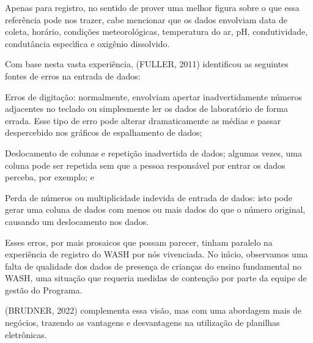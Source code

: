 \documentclass[
12pt,		%
openright,	%
twoside,  %
a4paper,			%
chapter=TITLE,		%
english,			%
french,				%
spanish,			%
brazil				%
]{USPSC-classe/USPSC}
\begin{document}
Apenas para registro, no sentido de prover uma melhor figura sobre o que essa refer\^encia pode nos trazer, cabe mencionar que os dados envolviam data de coleta, hor\'ario, condi\c{c}\~oes meteorol\'ogicas, temperatura do ar, pH, condutividade, condut\^ancia espec\'{\i}fica e oxig\^enio dissolvido.









Com base nesta vasta experi\^encia,  (FULLER, 2011) identificou as seguintes fontes de erros na entrada de dados:










\begin{alineas}
\item Erros de digita\c{c}\~ao: normalmente, envolviam apertar inadvertidamente n\'umeros adjacentes no teclado ou simplesmente ler os dados de laborat\'orio de forma errada. Esse tipo de erro pode alterar dramaticamente as m\'edias e passar despercebido nos gr\'aficos de espalhamento de dados;
\item Deslocamento de colunas e repeti\c{c}\~ao inadvertida de dados; algumas vezes, uma coluna pode ser repetida sem que a pessoa respons\'avel por entrar os dados perceba, por exemplo; e
\item Perda de n\'umeros ou multiplicidade indevida de entrada de dados: isto pode gerar uma coluna de dados com menos ou mais dados do que o n\'umero original, causando um deslocamento nos dados.
\end{alineas}

Esses erros, por mais prosaicos que possam parecer, tinham paralelo na experi\^encia de registro do WASH por n\'os vivenciada. No in\'{\i}cio, observamos uma falta de qualidade dos dados de presen\c{c}a de crian\c{c}as do ensino fundamental no WASH, uma situa\c{c}\~ao que requeria medidas de conten\c{c}\~ao por parte da equipe de gest\~ao do Programa.









(BRUDNER, 2022) complementa essa vis\~ao, mas com uma abordagem mais de neg\'ocios, trazendo as vantagens e desvantagens na utiliza\c{c}\~ao de planilhas eletr\^onicas.
\end{document}
